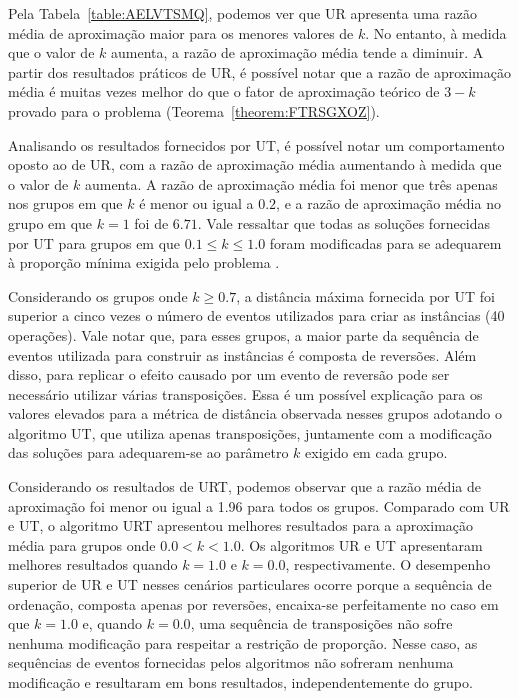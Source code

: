

Pela Tabela~\ref{table:AELVTSMQ}, podemos ver que UR apresenta uma razão média de aproximação maior para os menores valores de $k$. No entanto, à medida que o valor de $k$ aumenta, a razão de aproximação média tende a diminuir. A partir dos resultados práticos de UR, é possível notar que a razão de aproximação média é muitas vezes melhor do que o fator de aproximação teórico de $3-k$ provado para o problema (Teorema~\ref{theorem:FTRSGXOZ}).

Analisando os resultados fornecidos por UT, é possível notar um comportamento oposto ao de UR, com a razão de aproximação média aumentando à medida que o valor de $k$ aumenta. A razão de aproximação média foi menor que três apenas nos grupos em que $k$ é menor ou igual a $0.2$, e a razão de aproximação média no grupo em que $k = 1$ foi de $6.71$. Vale ressaltar que todas as soluções fornecidas por UT para grupos em que $0.1 \le k \le 1.0$ foram modificadas para se adequarem à proporção mínima exigida pelo problema \SbPRT.

Considerando os grupos onde $k \ge 0.7$, a distância máxima fornecida por UT foi superior a cinco vezes o número de eventos utilizados para criar as instâncias (40 operações). Vale notar que, para esses grupos, a maior parte da sequência de eventos utilizada para construir as instâncias é composta de reversões. Além disso, para replicar o efeito causado por um evento de reversão pode ser necessário utilizar várias transposições. Essa é um possível explicação para os valores elevados para a métrica de distância observada nesses grupos adotando o algoritmo UT, que utiliza apenas transposições, juntamente com a modificação das soluções para adequarem-se ao parâmetro $k$ exigido em cada grupo. 

Considerando os resultados de URT, podemos observar que a razão média de aproximação foi menor ou igual a 1.96 para todos os grupos. Comparado com UR e UT, o algoritmo URT apresentou melhores resultados para a aproximação média para grupos onde $0.0 < k < 1.0$. Os algoritmos UR e UT apresentaram melhores resultados quando $k = 1.0$ e $k = 0.0$, respectivamente. O desempenho superior de UR e UT nesses cenários particulares ocorre porque a sequência de ordenação, composta apenas por reversões, encaixa-se perfeitamente no caso em que $k = 1.0$ e, quando $k = 0.0$, uma sequência de transposições não sofre nenhuma modificação para respeitar a restrição de proporção. Nesse caso, as sequências de eventos fornecidas pelos algoritmos não sofreram nenhuma modificação e resultaram em bons resultados, independentemente do grupo.

